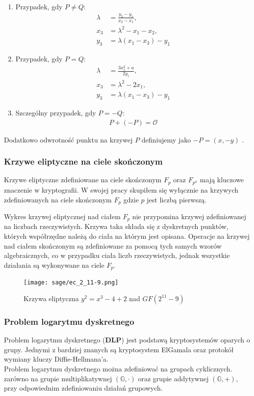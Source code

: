 \begin{enumerate}
    \item Przypadek, gdy \( P \neq Q \):
          \begin{align}
              \lambda & = \frac{y_2 - y_1}{x_2 - x_1}, \\
              x_3     & = \lambda^2 - x_1 - x_2,       \\
              y_3     & = \lambda(x_1 - x_3) - y_1
          \end{align}
    \item Przypadek, gdy \( P = Q \):
          \begin{align*}
              \lambda & = \frac{3x_1^2 + a}{2y_1}, \\
              x_3     & = \lambda^2 - 2x_1,        \\
              y_3     & = \lambda(x_1 - x_3) - y_1
          \end{align*}
    \item Szczególny przypadek, gdy \( P = -Q \):
          \begin{align*}
              P + (-P) = \mathcal{O}
          \end{align*}
\end{enumerate}
Dodatkowo odwrotność punktu na krzywej $P$ definiujemy jako $-P = (x, -y)$ \cite{Stinson2021}.


\subsubsection{Krzywe eliptyczne na ciele skończonym}
Krzywe eliptyczne zdefiniowane na ciele skończonym $F_p$ oraz $F_{p^n}$ mają kluczowe znaczenie w kryptografii.
W swojej pracy skupiłem się wyłącznie na krzywych zdefiniowanych na ciele skończonym $F_p$ gdzie $p$ jest liczbą pierwszą.
\par
Wykres krzywej eliptycznej nad ciałem $F_p$ nie przypomina krzywej zdefiniowanej na liczbach rzeczywistych.
Krzywa taka składa się z dyskretnych punktów, których współrzędne należą do ciała
na którym jest opisana.
Operacje na krzywej nad ciałem skończonym są zdefiniowane
za pomocą tych samych wzorów algebraicznych, co w przypadku ciała liczb rzeczywistych,
jednak wszystkie działania są wykonywane na ciele $F_p$.
\begin{figure}[!h]
    \centering \texttt{[image: sage/ec\_2\_11-9.png]}
    \caption{Krzywa eliptyczna $y^2=x^3-4+2$ nad $GF(2^{11} - 9)$}
\end{figure}


\subsubsection{Problem logarytmu dyskretnego}
Problem logarytmu dyskretnego (\textbf{DLP}) jest
podstawą kryptosystemów oparych o grupy.
Jednymi z bardziej znanych są kryptosystem ElGamala oraz protokół wymiany
kluczy Diffie-Hellmana'a.
\\ Problem logarytmu dyskretnego można zdefiniować na grupach cyklicznych.
zarówno na grupie multiplikatywnej $(\mathbb{G},\cdot)$
oraz grupie addytywnej $(\mathbb{G}, +)$, przy odpowiednim zdefiniowaniu działań grupowych.

